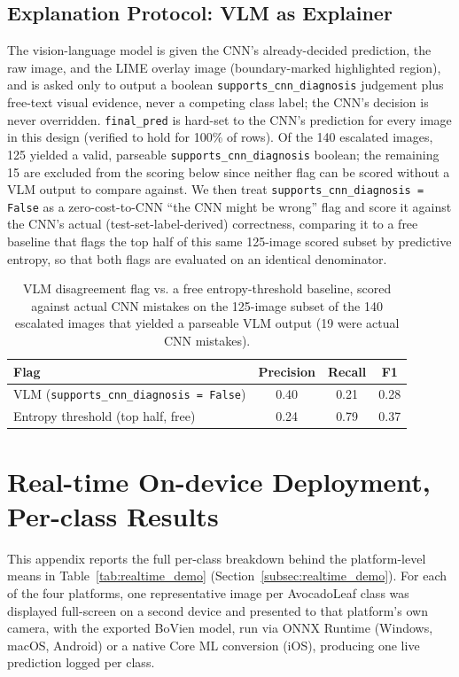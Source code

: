 \subsection{Explanation Protocol: VLM as Explainer}

The vision-language model is given the CNN's already-decided prediction, the raw image, and the LIME overlay image (boundary-marked highlighted region), and is asked only to output a boolean \texttt{supports\_cnn\_diagnosis} judgement plus free-text visual evidence, never a competing class label; the CNN's decision is never overridden. \texttt{final\_pred} is hard-set to the CNN's prediction for every image in this design (verified to hold for 100\% of rows). Of the 140 escalated images, 125 yielded a valid, parseable \texttt{supports\_cnn\_diagnosis} boolean; the remaining 15 are excluded from the scoring below since neither flag can be scored without a VLM output to compare against. We then treat \texttt{supports\_cnn\_diagnosis = False} as a zero-cost-to-CNN ``the CNN might be wrong'' flag and score it against the CNN's actual (test-set-label-derived) correctness, comparing it to a free baseline that flags the top half of this same 125-image scored subset by predictive entropy, so that both flags are evaluated on an identical denominator.

\begin{table}[htbp]
\centering
\caption{VLM disagreement flag vs. a free entropy-threshold baseline, scored against actual CNN mistakes on the 125-image subset of the 140 escalated images that yielded a parseable VLM output (19 were actual CNN mistakes).}
\label{tab:llm_flagging}
\small
\begin{tabular}{lccc}
\toprule
\textbf{Flag} & \textbf{Precision} & \textbf{Recall} & \textbf{F1} \\
\midrule
VLM (\texttt{supports\_cnn\_diagnosis = False}) & 0.40 & 0.21 & 0.28 \\
Entropy threshold (top half, free)              & 0.24 & 0.79 & 0.37 \\
\bottomrule
\end{tabular}
\end{table}

\section{Real-time On-device Deployment, Per-class Results}
\label{app:realtime_demo}

This appendix reports the full per-class breakdown behind the platform-level means in Table~\ref{tab:realtime_demo} (Section~\ref{subsec:realtime_demo}). For each of the four platforms, one representative image per AvocadoLeaf class was displayed full-screen on a second device and presented to that platform's own camera, with the exported BoVien model, run via ONNX Runtime (Windows, macOS, Android) or a native Core ML conversion (iOS), producing one live prediction logged per class.

